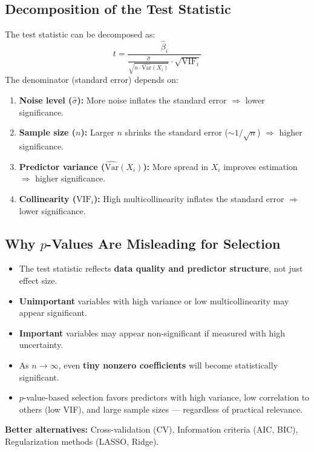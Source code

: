 \documentclass{article}
\begin{document}
\subsection{Decomposition of the Test Statistic}
The test statistic can be decomposed as:
$$t = \frac{\hat{\beta}_i}{\displaystyle \frac{\hat{\sigma}}{\sqrt{n \cdot \widehat{\text{Var}}(X_i)}} \cdot \sqrt{\text{VIF}_i}}$$
The denominator (standard error) depends on:
\begin{enumerate}
    \item \textbf{Noise level ($\hat{\sigma}$):} More noise inflates the standard error $\Rightarrow$ lower significance.
    \item \textbf{Sample size ($n$):} Larger $n$ shrinks the standard error ($\sim 1/\sqrt{n}$) $\Rightarrow$ higher significance.
    \item \textbf{Predictor variance ($\widehat{\text{Var}}(X_i)$):} More spread in $X_i$ improves estimation $\Rightarrow$ higher significance.
    \item \textbf{Collinearity ($\text{VIF}_i$):} High multicollinearity inflates the standard error $\Rightarrow$ lower significance.
\end{enumerate}

\subsection{Why $p$-Values Are Misleading for Selection}
\begin{itemize}
    \item The test statistic reflects \textbf{data quality and predictor structure}, not just effect size.
    \item \textbf{Unimportant} variables with high variance or low multicollinearity may appear significant.
    \item \textbf{Important} variables may appear non-significant if measured with high uncertainty.
    \item As $n \to \infty$, even \textbf{tiny nonzero coefficients} will become statistically significant.
    \item $p$-value-based selection favors predictors with high variance, low correlation to others (low VIF), and large sample sizes --- regardless of practical relevance.
\end{itemize}

\noindent\textbf{Better alternatives:} Cross-validation (CV), Information criteria (AIC, BIC), Regularization methods (LASSO, Ridge).
\end{document}

